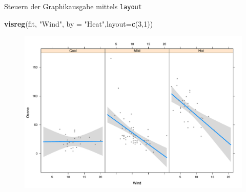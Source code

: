 \documentclass[ignorenonframetext,]{beamer}
\newenvironment{Shaded}{}{}
\newcommand{\KeywordTok}[1]{\textcolor[rgb]{0.00,0.44,0.13}{\textbf{{#1}}}}
\newcommand{\DataTypeTok}[1]{\textcolor[rgb]{0.56,0.13,0.00}{{#1}}}
\newcommand{\DecValTok}[1]{\textcolor[rgb]{0.25,0.63,0.44}{{#1}}}
\newcommand{\StringTok}[1]{\textcolor[rgb]{0.25,0.44,0.63}{{#1}}}
\newcommand{\NormalTok}[1]{{#1}}
\begin{document}
\begin{frame}[fragile]{Steuern der Graphikausgabe mittels
\texttt{layout}}

\begin{Shaded}
\begin{Highlighting}[]
\KeywordTok{visreg}\NormalTok{(fit, }\StringTok{"Wind"}\NormalTok{, }\DataTypeTok{by =} \StringTok{"Heat"}\NormalTok{,}\DataTypeTok{layout=}\KeywordTok{c}\NormalTok{(}\DecValTok{3}\NormalTok{,}\DecValTok{1}\NormalTok{))}
\end{Highlighting}
\end{Shaded}

\begin{figure}[htbp]
\centering
\includegraphics{RSocialScience2_files/figure-beamer/unnamed-chunk-86-1.pdf}
\caption{}
\end{figure}

\end{frame}
\end{document}
